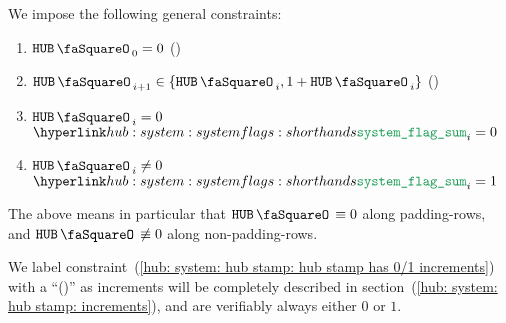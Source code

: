 We impose the following general constraints:
\begin{enumerate}
	\item $\hubStamp _{0} = 0$ (\sanityCheck)
	\item \label{hub: system: hub stamp: hub stamp has 0/1 increments} $\hubStamp _{i + 1} \in \{ \hubStamp _{i}, 1 + \hubStamp _{i}\}$ (\sanityCheck)
	\item \If $\hubStamp _{i} =    0$ \Then $\flagSum _{i} = 0$
	\item \If $\hubStamp _{i} \neq 0$ \Then $\flagSum _{i} = 1$
\end{enumerate}
\saNote{}
The above means in particular that
$\hubStamp \equiv  0$ along padding-rows, and
$\hubStamp \not\equiv 0$ along non-padding-rows.

\saNote{}
We label constraint~(\ref{hub: system: hub stamp: hub stamp has 0/1 increments})
with a ``(\sanityCheck)'' as \hubStamp{} increments will be completely described in
section~(\ref{hub: system: hub stamp: increments}),
and are verifiably always either $0$ or $1$.
